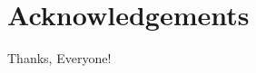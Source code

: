 \documentclass[a4paper,oneside,12pt]{book}
\numberwithin{equation}{chapter} %
\begin{document}
\section*{\Huge\textcolor{tcd_blue}{Acknowledgements}}
Thanks, Everyone!
\newpage

\listoffigures
\tableofcontents
\newpage

\end{document}
